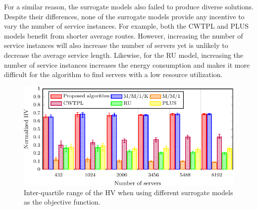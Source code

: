 For a similar reason, the surrogate models also failed to produce diverse solutions. Despite their differences, none of the surrogate models provide any incentive to vary the number of service instances. For example, both the CWTPL and PLUS models benefit from shorter average routes. However, increasing the number of service instances will also increase the number of servers yet is unlikely to decrease the average service length. Likewise, for the RU model, increasing the number of service instances increases the energy consumption and makes it more difficult for the algorithm to find servers with a low resource utilization.

\begin{figure}[t!]
    \centering
    \includegraphics[width=\columnwidth]{graphs/model/models-crop}
    \caption{Inter-quartile range of the HV when using different surrogate models as the objective function.}
    \label{fig:model_benefits}
\end{figure}

